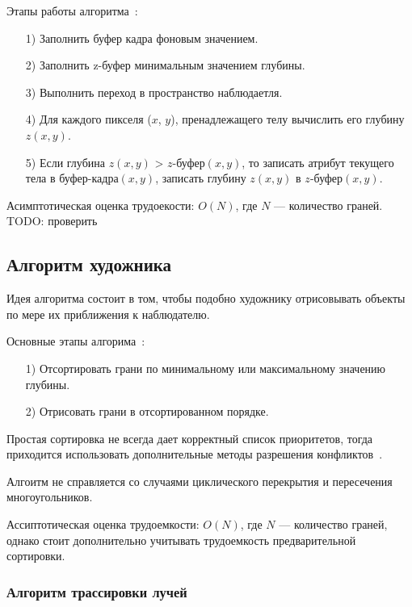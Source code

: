    Этапы работы алгоритма~\cite{rogers}:
   
   \begin{enumerate}
   	\item[1)] Заполнить буфер кадра фоновым значением.
   	\item[2)] Заполнить z-буфер минимальным значением глубины.
   	\item[3)] Выполнить переход в пространство наблюдаетля.
   	\item[4)] Для каждого пикселя ($x$, $y$), пренадлежащего телу вычислить его глубину $z(x, y)$.
   	\item[5)] Если глубина $z(x, y)$ > $z\textit{-буфер}(x, y)$, то записать атрибут текущего тела в $\textit{буфер-кадра}(x, y)$, записать глубину $z(x, y)$ в $z\textit{-буфер}(x, y)$.
   \end{enumerate}
   
   
   Асимптотическая оценка трудоекости: $O(N)$, где $N$ --- количество граней. TODO: проверить
      
   \subsection{Алгоритм художника}
   
   Идея алгоритма состоит в том, чтобы подобно художнику отрисовывать объекты по мере их приближения к наблюдателю.
   
   Основные этапы алгорима~\cite{rogers}:
   \begin{enumerate}
   	\item[1)] Отсортировать грани по минимальному или максимальному значению глубины.
   	\item[2)] Отрисовать грани в отсортированном порядке.
   \end{enumerate}
   
   Простая сортировка не всегда дает корректный список приоритетов, тогда приходится использовать дополнительные методы разрешения конфликтов~\cite{rogers}. 
   
   Алгоитм не справляется со случаями циклического перекрытия и пересечения многоугольников.
   
   Ассиптотическая оценка трудоемкости: $O(N)$, где $N$ --- количество граней, однако стоит дополнительно учитывать трудоемкость предварительной сортировки.
     
    \subsubsection{Алгоритм трассировки лучей}
    
